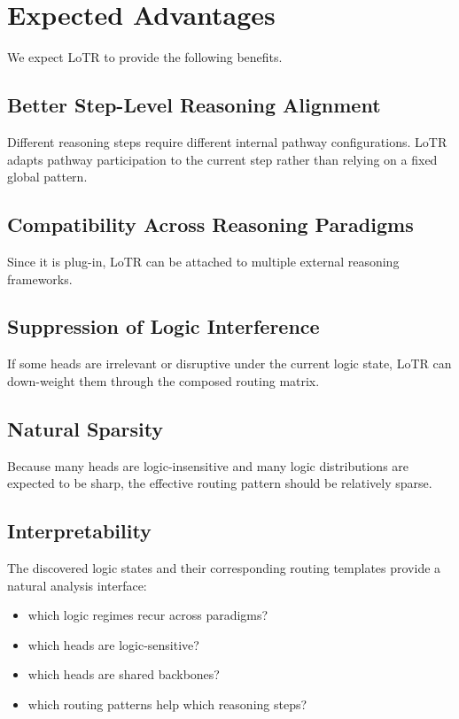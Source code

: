 \documentclass[11pt]{article}
\begin{document}
\section{Expected Advantages}

We expect LoTR to provide the following benefits.

\subsection{Better Step-Level Reasoning Alignment}

Different reasoning steps require different internal pathway configurations. LoTR adapts pathway participation to the current step rather than relying on a fixed global pattern.

\subsection{Compatibility Across Reasoning Paradigms}

Since it is plug-in, LoTR can be attached to multiple external reasoning frameworks.

\subsection{Suppression of Logic Interference}

If some heads are irrelevant or disruptive under the current logic state, LoTR can down-weight them through the composed routing matrix.

\subsection{Natural Sparsity}

Because many heads are logic-insensitive and many logic distributions are expected to be sharp, the effective routing pattern should be relatively sparse.

\subsection{Interpretability}

The discovered logic states and their corresponding routing templates provide a natural analysis interface:
\begin{itemize}[leftmargin=1.5em]
    \item which logic regimes recur across paradigms?
    \item which heads are logic-sensitive?
    \item which heads are shared backbones?
    \item which routing patterns help which reasoning steps?
\end{itemize}
\end{document}
